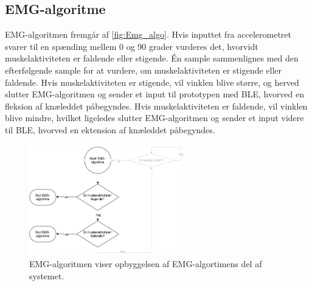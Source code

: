 \subsection{EMG-algoritme}
EMG-algoritmen fremgår af \autoref{fig:Emg_algo}. Hvis inputtet fra accelerometret svarer til en spænding mellem 0 og 90 grader vurderes det, hvorvidt muskelaktiviteten er faldende eller stigende. Én sample sammenlignes med den efterfølgende sample for at vurdere, om muskelaktiviteten er stigende eller faldende. Hvis muskelaktiviteten er stigende, vil vinklen blive større, og herved slutter EMG-algoritmen og sender et input til prototypen med BLE, hvorved en fleksion af knæleddet påbegyndes. Hvis muskelaktiviteten er faldende, vil vinklen blive mindre, hvilket ligeledes slutter EMG-algoritmen og sender et input videre til BLE, hvorved en ektension af knæleddet påbegyndes. 
\begin{figure}[H]
\centering
\includegraphics[width=0.6\textwidth]{figures/implementering/EMG_algo.png}
\caption{EMG-algoritmen viser opbyggelsen af EMG-algortimens del af systemet.}
\label{fig:Emg_algo}
\end{figure}

